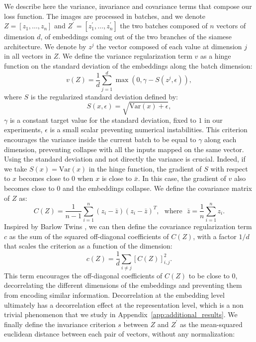 \documentclass{article} %
\begin{document}
We describe here the variance, invariance and covariance terms that compose our loss function. The images are processed in batches, and we denote $Z = [z_1, \dots, z_n]$ and $Z^{\prime} = [z_1^{\prime}, \dots, z_n^{\prime}]$ the two batches composed of $n$ vectors of dimension $d$, of embeddings coming out of the two branches of the siamese architecture. We denote by $z^{j}$ the vector composed of each value at dimension $j$ in all vectors in $Z$. We define the variance regularization term $v$ as a hinge function on the standard deviation of the embeddings along the batch dimension:
\begin{equation} \label{eq:var_loss}
    v(Z) = \frac{1}{d} \sum_{j=1}^{d} \max(0, \gamma - S(z^{j}, \epsilon)),
\end{equation}
where $S$ is the regularized standard deviation defined by:
\begin{equation}
    S(x, \epsilon) = \sqrt{\mathrm{Var}(x) + \epsilon},
\end{equation}
$\gamma$ is a constant target value for the standard deviation, fixed to $1$ in our experiments, $\epsilon$ is a small scalar preventing numerical instabilities. This criterion encourages the variance inside the current batch to be equal to $\gamma$ along each dimension, preventing collapse with all the inputs mapped on the same vector. Using the standard deviation and not directly the variance is crucial. Indeed, if we take $S(x) = \mathrm{Var}(x)$ in the hinge function, the gradient of $S$ with respect to $x$ becomes close to 0 when $x$ is close to $\bar{x}$. In this case, the gradient of $v$ also becomes close to 0 and the embeddings collapse. We define the covariance matrix of $Z$ as:
\begin{equation} \label{eq:covariance}
    C(Z) = \frac{1}{n - 1} \sum_{i=1}^{n} (z_{i} - \bar{z})(z_{i} - \bar{z})^{T}, \ \ \ \textrm{where} \ \ \ \bar{z} = \frac{1}{n} \sum_{i=1}^{n} z_{i}.
\end{equation}
Inspired by Barlow Twins \cite{zbontar2021barlow}, we can then define the covariance regularization term $c$ as the sum of the squared off-diagonal coefficients of $C(Z)$, with a factor $1/d$ that scales the criterion as a function of the dimension:
\begin{equation} \label{eq:cov_loss}
    c(Z) = \frac{1}{d} \sum_{i \ne j} [C(Z)]_{i,j}^2.
\end{equation}
This term encourages the off-diagonal coefficients of $C(Z)$ to be close to $0$, decorrelating the different dimensions of the embeddings and preventing them from encoding similar information. Decorrelation at the embedding level ultimately has a decorrelation effect at the representation level, which is a non trivial phenomenon that we study in Appendix~\ref{app:additional_results}. We finally define the invariance criterion $s$ between $Z$ and $Z^{\prime}$ as the mean-squared euclidean distance between each pair of vectors, without any normalization:
\end{document}
